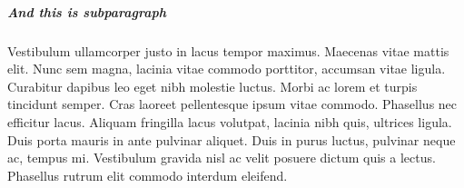 \documentclass[12pt]{amari}
\begin{document}
\subparagraph{And this is subparagraph}
Vestibulum ullamcorper justo in lacus tempor maximus. Maecenas vitae mattis elit. Nunc sem magna, lacinia vitae commodo porttitor, accumsan vitae ligula. Curabitur dapibus leo eget nibh molestie luctus. Morbi ac lorem et turpis tincidunt semper. Cras laoreet pellentesque ipsum vitae commodo. Phasellus nec efficitur lacus. Aliquam fringilla lacus volutpat, lacinia nibh quis, ultrices ligula. Duis porta mauris in ante pulvinar aliquet. Duis in purus luctus, pulvinar neque ac, tempus mi. Vestibulum gravida nisl ac velit posuere dictum quis a lectus. Phasellus rutrum elit commodo interdum eleifend.
\end{document}
